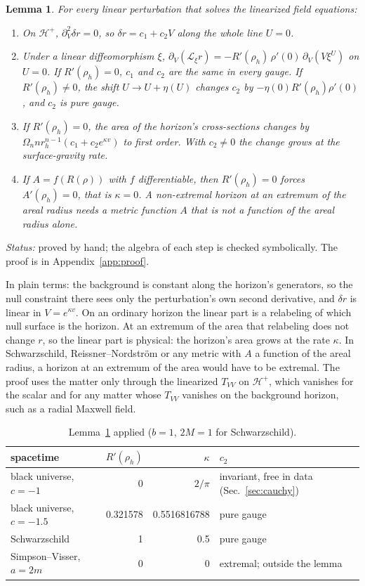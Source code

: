 \documentclass[11pt]{article}
\theoremstyle{plain}
\newtheorem{lemma}{Lemma}
\newcommand{\Hp}{\mathcal H^+}
\begin{document}
\begin{lemma}\label{lem:horizon}
For every linear perturbation that solves the linearized field equations:
\begin{enumerate}
\item On $\Hp$, $\partial_V^2\delta r=0$, so $\delta r=c_1+c_2V$ along the whole line $U=0$.
\item Under a linear diffeomorphism $\xi$, $\partial_V(\mathcal L_\xi r)=-R'(\rho_h)\,\rho'(0)\,\partial_V(V\xi^U)$ on $U=0$. If
  $R'(\rho_h)=0$, $c_1$ and $c_2$ are the same in every gauge. If $R'(\rho_h)\ne0$, the shift $U\to U+\eta(U)$ changes $c_2$
  by $-\eta(0)R'(\rho_h)\rho'(0)$, and $c_2$ is pure gauge.
\item If $R'(\rho_h)=0$, the area of the horizon's cross-sections changes by $\Omega_n n r_h^{n-1}(c_1+c_2e^{\kappa v})$ to
  first order. With $c_2\ne0$ the change grows at the surface-gravity rate.
\item If $A=f(R(\rho))$ with $f$ differentiable, then $R'(\rho_h)=0$ forces $A'(\rho_h)=0$, that is $\kappa=0$. A non-extremal
  horizon at an extremum of the areal radius needs a metric function $A$ that is not a function of the areal radius alone.
\end{enumerate}
\end{lemma}

\noindent\emph{Status:} proved by hand; the algebra of each step is checked symbolically. The proof is in
Appendix~\ref{app:proof}.

In plain terms: the background is constant along the horizon's generators, so the null constraint there sees only the
perturbation's own second derivative, and $\delta r$ is linear in $V=e^{\kappa v}$. On an ordinary horizon the linear part is
a relabeling of which null surface is the horizon. At an extremum of the area that relabeling does not change $r$, so the
linear part is physical: the horizon's area grows at the rate $\kappa$. In Schwarzschild, Reissner--Nordström or any metric
with $A$ a function of the areal radius, a horizon at an extremum of the area would have to be extremal. The proof uses the matter only
through the linearized $T_{VV}$ on $\Hp$, which vanishes for the scalar and for any matter whose $T_{VV}$ vanishes on the
background horizon, such as a radial Maxwell field.
\nopagebreak
\begin{table}[H]
\centering
\caption{Lemma~\ref{lem:horizon} applied ($b=1$, $2M=1$ for Schwarzschild).}
\label{tab:lemma}
\begin{tabular}{lrrl}
\toprule
spacetime & $R'(\rho_h)$ & $\kappa$ & $c_2$ \\
\midrule
black universe, $c=-1$ & 0 & $2/\pi$ & invariant, free in data (Sec.~\ref{sec:cauchy}) \\
black universe, $c=-1.5$ & 0.321578 & 0.5516816788 & pure gauge \\
Schwarzschild & 1 & 0.5 & pure gauge \\
Simpson--Visser, $a=2m$ & 0 & 0 & extremal; outside the lemma \\
\bottomrule
\end{tabular}
\end{table}
\end{document}
